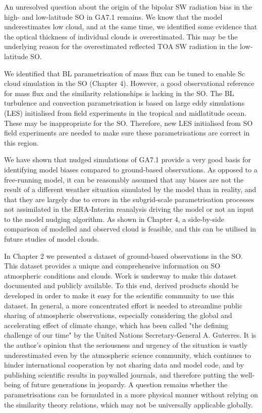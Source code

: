 An unresolved question about the origin of the bipolar SW radiation
bias in the high- and low-latitude SO in GA7.1 remains. We know that
the model underestimates low cloud, and at the same time, we identified
some evidence that the optical thickness of individual clouds is overestimated.
This may be the underlying reason for the overestimated reflected TOA SW
radiation in the low-latitude SO.

We identified that BL parametrisation of mass flux can be tuned
to enable Sc cloud simulation in the SO (Chapter 4). However,
a good observational reference for mass flux and the similarity relationships
is lacking in the SO. The BL turbulence and convection
parametrisation is based on large eddy simulations (LES) initialised
from field experiments in the tropical and midlatitude ocean. These may be
inappropriate for the SO. Therefore, new LES initialised from SO field
experiments are needed to make sure these parametrisations are correct in this
region.

We have shown that nudged simulations of GA7.1 provide a very good basis
for identifying model biases compared to ground-based observations. As opposed
to a free-running model, it can be reasonably assumed that any biases are
not the result of a different weather situation simulated by the model
than in reality, and that they are largely due to errors in the subgrid-scale
parametrisation processes not assimilated in the ERA-Interim reanalysis driving
the model or not an input to the model nudging algorithm. As shown in Chapter 4,
a side-by-side comparison of modelled and observed cloud is feasible, and this
can be utilised in future studies of model clouds.

In Chapter 2 we presented a dataset of ground-based observations in the SO.
This dataset provides a unique and comprehensive information on SO atmospheric
conditions and clouds. Work is underway to make this dataset documented and
publicly available. To this end, derived products should be developed in order
to make it easy for the scientific community to use this dataset. In general,
a more concentrated effort is needed to streamline public sharing of atmospheric
observations, especially considering the global and accelerating
effect of climate change, which has been called
"the defining challenge of our time" \citep{wmo2019} by the United Nations
Secretary-General A. Guterres. It is the author's opinion that the
seriousness and urgency of the situation is vastly underestimated even
by the atmospheric science community, which continues to hinder international
cooperation by not sharing data and model code, and by publishing scientific
results in paywalled journals, and therefore putting the well-being of future
generations in jeopardy. A question remains whether the parametrisations
can be formulated in a more physical manner without relying on the similarity
theory relations, which may not be universally applicable globally.

